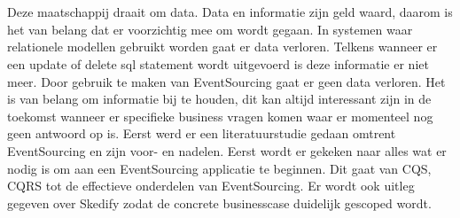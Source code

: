 


\chapter*{}

Deze maatschappij draait om data. Data en informatie zijn geld waard, daarom is het van belang dat er voorzichtig mee om wordt gegaan. In systemen waar relationele modellen gebruikt worden gaat er data verloren. Telkens wanneer er een update of delete sql statement wordt uitgevoerd is deze informatie er niet meer. Door gebruik te maken van EventSourcing gaat er geen data verloren.
Het is van belang om informatie bij te houden, dit kan altijd interessant zijn in de toekomst wanneer er specifieke business vragen komen waar er momenteel nog geen antwoord op is.
Eerst werd er een literatuurstudie gedaan omtrent EventSourcing en zijn voor- en nadelen.
Eerst wordt er gekeken naar alles wat er nodig is om aan een EventSourcing applicatie te beginnen. Dit gaat van CQS, CQRS tot de effectieve onderdelen van EventSourcing. Er wordt ook uitleg gegeven over Skedify zodat de concrete businesscase duidelijk gescoped wordt.
